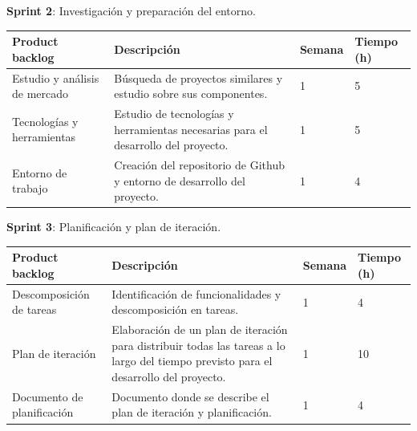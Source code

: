 \textbf{Sprint 2}: Investigación y preparación del entorno.

\begin{table}[h!]
\begin{tabular}{|p{4cm}|p{7.2cm}|p{1.3cm}|p{2.1cm}|}
\hline
\rowcolor[HTML]{9B9B9B} 
{\color[HTML]{FFFFFF} Product backlog} & {\color[HTML]{FFFFFF} Descripción}                                  & {\color[HTML]{FFFFFF} Semana} & {\color[HTML]{FFFFFF}Tiempo (h)} \\ \hline
Estudio y análisis de mercado                             & Búsqueda de proyectos similares y estudio sobre sus componentes.
                                        & 1                             & 5                                    \\ \hline
Tecnologías y herramientas                        & Estudio de tecnologías y herramientas necesarias para el desarrollo del proyecto.
                                  & 1                             & 5                                   \\ \hline
Entorno de trabajo                          & Creación del repositorio de Github y entorno de desarrollo del proyecto.
          & 1                             & 4                                   \\ \hline
\end{tabular}
\end{table}

\newpage

\textbf{Sprint 3}: Planificación y plan de iteración.


\begin{table}[h!]
\begin{tabular}{|p{4cm}|p{7.2cm}|p{1.3cm}|p{2.1cm}|}
\hline
\rowcolor[HTML]{9B9B9B} 
{\color[HTML]{FFFFFF} Product backlog} & {\color[HTML]{FFFFFF} Descripción}                                  & {\color[HTML]{FFFFFF} Semana} & {\color[HTML]{FFFFFF}Tiempo (h)} \\ \hline
Descomposición de tareas                             & Identificación de funcionalidades y descomposición en tareas.
                                        & 1                             & 4                                   \\ \hline
Plan de iteración                        & Elaboración de un plan de iteración para distribuir todas las tareas a lo largo del tiempo previsto para el desarrollo del proyecto.
                                  & 1                             & 10                                  \\ \hline
Documento de planificación                          & Documento donde se describe el plan de iteración y planificación.
          & 1                             & 4                                   \\ \hline
\end{tabular}
\end{table}


